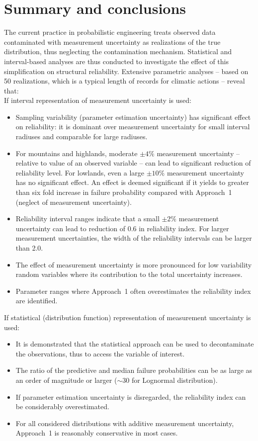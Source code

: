 \section{Summary and conclusions}
The current practice in probabilistic engineering treats observed data contaminated with measurement uncertainty as realizations of the true distribution, thus neglecting the contamination mechanism. Statistical and interval-based analyses are thus conducted to investigate the effect of this simplification on structural reliability. Extensive parametric analyses -- based on 50 realizations, which is a typical length of records for climatic actions -- reveal that:\\
If interval representation of measurement uncertainty is used:
\begin{itemize}
	\item Sampling variability (parameter estimation uncertainty) has significant effect on reliability: it is dominant over measurement uncertainty for small interval radiuses and comparable for large radiuses.
	\item For mountains and highlands, moderate $\pm 4\%$ measurement uncertainty -- relative to value of an observed variable -- can lead to significant reduction of reliability level. For lowlands, even a large $\pm 10\%$ measurement uncertainty has no significant effect. An effect is deemed significant if it yields to greater than six fold increase in failure probability compared with Approach~1 (neglect of measurement uncertainty).
	\item Reliability interval ranges indicate that a small $\pm 2\%$ measurement uncertainty can lead to reduction of 0.6 in reliability index. For larger measurement uncertainties, the width of the reliability intervals can be larger than 2.0.
	\item The effect of measurement uncertainty is more pronounced for low variability random variables where its contribution to the total uncertainty increases.
	\item Parameter ranges where Approach~1 often overestimates the reliability index are identified.
\end{itemize}
If statistical (distribution function) representation of measurement uncertainty is used:
\begin{itemize}
	\item It is demonstrated that the statistical approach can be used to decontaminate the observations, thus to access the variable of interest.
	\item The ratio of the predictive and median failure probabilities can be as large as an order of magnitude or larger ($\sim30$ for Lognormal distribution).
	\item If parameter estimation uncertainty is disregarded, the reliability index can be considerably overestimated.
	\item For all considered distributions with additive measurement uncertainty, Approach~1 is reasonably conservative in most cases.
\end{itemize}

